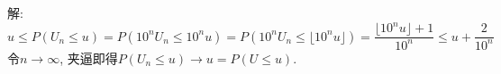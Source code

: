 \documentclass[standard]{ExBook}
\begin{document}
\begin{qitems}
\vspace{-5em}

    \begin{bbox}
解: 
$$\displaystyle u \leq P(U_n\leq u)=P(10^n U_n\leq 10^n u)=P(10^n U_n\leq \lfloor10^n u\rfloor)=\frac{\lfloor10^n u\rfloor+1}{10^n} \leq u+\frac{2}{10^n}$$
令$n\to\infty$, 夹逼即得$P(U_n\leq u)\to u=P(U\leq u)$.
    \end{bbox}
\end{qitems}


\section{}
\end{document}
